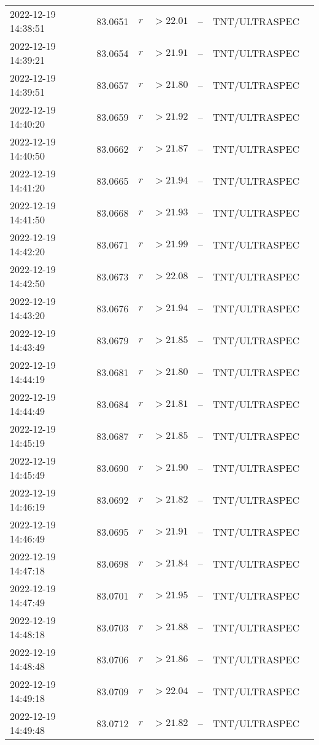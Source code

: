 \documentclass{nature_plusfigure}
\begin{document}
\begin{supplement}
\begin{center}
\begin{longtable}{lllllll}
2022-12-19 14:38:51 & 83.0651 & $r$ & $>22.01$ & -- & TNT/ULTRASPEC &  \\ 
2022-12-19 14:39:21 & 83.0654 & $r$ & $>21.91$ & -- & TNT/ULTRASPEC &  \\ 
2022-12-19 14:39:51 & 83.0657 & $r$ & $>21.80$ & -- & TNT/ULTRASPEC &  \\ 
2022-12-19 14:40:20 & 83.0659 & $r$ & $>21.92$ & -- & TNT/ULTRASPEC &  \\ 
2022-12-19 14:40:50 & 83.0662 & $r$ & $>21.87$ & -- & TNT/ULTRASPEC &  \\ 
2022-12-19 14:41:20 & 83.0665 & $r$ & $>21.94$ & -- & TNT/ULTRASPEC &  \\ 
2022-12-19 14:41:50 & 83.0668 & $r$ & $>21.93$ & -- & TNT/ULTRASPEC &  \\ 
2022-12-19 14:42:20 & 83.0671 & $r$ & $>21.99$ & -- & TNT/ULTRASPEC &  \\ 
2022-12-19 14:42:50 & 83.0673 & $r$ & $>22.08$ & -- & TNT/ULTRASPEC &  \\ 
2022-12-19 14:43:20 & 83.0676 & $r$ & $>21.94$ & -- & TNT/ULTRASPEC &  \\ 
2022-12-19 14:43:49 & 83.0679 & $r$ & $>21.85$ & -- & TNT/ULTRASPEC &  \\ 
2022-12-19 14:44:19 & 83.0681 & $r$ & $>21.80$ & -- & TNT/ULTRASPEC &  \\ 
2022-12-19 14:44:49 & 83.0684 & $r$ & $>21.81$ & -- & TNT/ULTRASPEC &  \\ 
2022-12-19 14:45:19 & 83.0687 & $r$ & $>21.85$ & -- & TNT/ULTRASPEC &  \\ 
2022-12-19 14:45:49 & 83.0690 & $r$ & $>21.90$ & -- & TNT/ULTRASPEC &  \\ 
2022-12-19 14:46:19 & 83.0692 & $r$ & $>21.82$ & -- & TNT/ULTRASPEC &  \\ 
2022-12-19 14:46:49 & 83.0695 & $r$ & $>21.91$ & -- & TNT/ULTRASPEC &  \\ 
2022-12-19 14:47:18 & 83.0698 & $r$ & $>21.84$ & -- & TNT/ULTRASPEC &  \\ 
2022-12-19 14:47:49 & 83.0701 & $r$ & $>21.95$ & -- & TNT/ULTRASPEC &  \\ 
2022-12-19 14:48:18 & 83.0703 & $r$ & $>21.88$ & -- & TNT/ULTRASPEC &  \\ 
2022-12-19 14:48:48 & 83.0706 & $r$ & $>21.86$ & -- & TNT/ULTRASPEC &  \\ 
2022-12-19 14:49:18 & 83.0709 & $r$ & $>22.04$ & -- & TNT/ULTRASPEC &  \\ 
2022-12-19 14:49:48 & 83.0712 & $r$ & $>21.82$ & -- & TNT/ULTRASPEC &  \\ 

\end{longtable}
\end{center}
\end{supplement}
\end{document}
